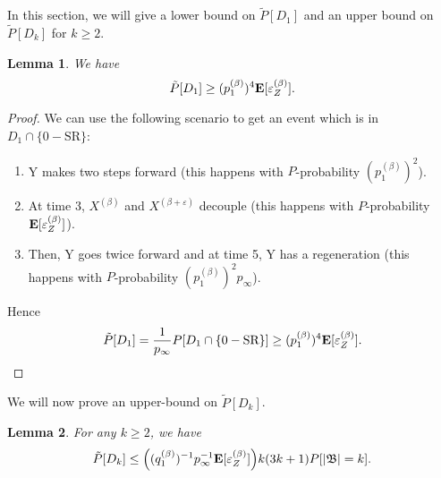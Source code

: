 \documentclass[12pt]{amsart}
\numberwithin{equation}{section}
\newtheorem{lemma}{Lemma}[section]
\begin{document}
 In this section, we will give a lower bound on $ \tilde{P}[D_1]$ and an upper bound on $ \tilde{P}[D_k]$ for $k\geq 2$.
 
 \begin{lemma}\label{lem1}
 We have
 \[
 \tilde{P}[D_1] \geq (p_1^{(\beta)})^4  {\bf E}[{\varepsilon}_Z^{(\beta)}].
 \]
 \end{lemma}
 
  \begin{proof}
  We can use the following scenario to get an event which is in $D_1\cap \{0-\text{SR}\}$: 
  \begin{enumerate}
  \item Y makes two steps forward (this happens with $P$-probability $(p_1^{(\beta)})^2$).
  \item At time 3, $X^{(\beta)}$ and $X^{(\beta+{\varepsilon})}$ decouple (this happens with $P$-probability ${\bf E}[{\varepsilon}_Z^{(\beta)}]$).
  \item Then, Y goes twice forward and at time 5, Y has a regeneration (this happens with $P$-probability $(p_1^{(\beta)})^2p_{\infty}$).
  \end{enumerate}
  
 Hence
 \[
 \tilde{P}[D_1]= \frac 1{p_{\infty}} P[D_1\cap \{0-\text{SR}\}] \geq (p_1^{(\beta)})^4 {\bf E}[{\varepsilon}_Z^{(\beta)}].
 \]
 \end{proof}
 
We will now prove an upper-bound on $\tilde{P}[D_k]$.
 \begin{lemma}\label{lem2}
 For any $k\geq 2$, we have
 \[
 \tilde{P}[D_k]\leq \Bigl( (q_1^{(\beta)})^{-1}p_{\infty}^{-1}{\bf E}[{\varepsilon}_Z^{(\beta)}] \Bigr) k(3k+1) P[{\left\vert {\mathfrak{B}}\right\vert}=k].
 \]
 \end{lemma}
 
\end{document}

